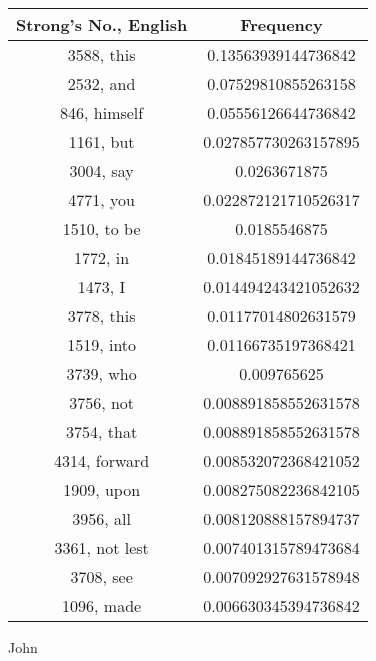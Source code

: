 \documentclass[12pt,letterpaper]{article}
\begin{document}
 \begin{longtable}{|c|c|}
\hline
 Strong's No., English & Frequency \\ \hline  
3588, this & 0.13563939144736842\\ \hline 
 2532, and & 0.07529810855263158\\ \hline 
 846, himself & 0.05556126644736842\\ \hline 
 1161, but & 0.027857730263157895\\ \hline 
 3004, say & 0.0263671875\\ \hline 
 4771, you & 0.022872121710526317\\ \hline 
 1510, to be & 0.0185546875\\ \hline 
 1772, in & 0.01845189144736842\\ \hline 
 1473, I & 0.014494243421052632\\ \hline 
 3778, this & 0.01177014802631579\\ \hline 
 1519, into & 0.01166735197368421\\ \hline 
 3739, who & 0.009765625\\ \hline 
 3756, not & 0.008891858552631578\\ \hline 
 3754, that & 0.008891858552631578\\ \hline 
 4314, forward & 0.008532072368421052\\ \hline 
 1909, upon & 0.008275082236842105\\ \hline 
 3956, all & 0.008120888157894737\\ \hline 
 3361, not lest & 0.007401315789473684\\ \hline 
 3708, see & 0.007092927631578948\\ \hline 
 1096, made & 0.006630345394736842\\ \hline 
\end{longtable} 
 

John
\end{document}

